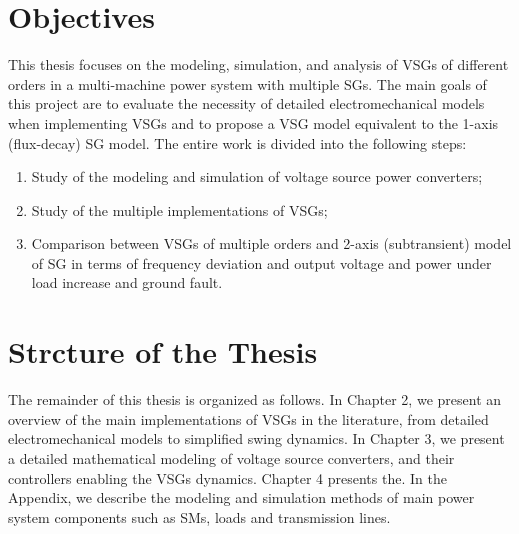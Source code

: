 \section{Objectives}
This thesis focuses on the modeling, simulation, and analysis of VSGs of
different orders in a multi-machine power system with multiple SGs. The main
goals of this project are to evaluate the necessity of detailed
electromechanical models when implementing VSGs and to propose a VSG model
equivalent to the 1-axis (flux-decay) SG model. The entire work is divided into
the following steps:

\begin{enumerate}
    \item Study of the modeling and simulation of voltage source power converters;
    \item Study of the multiple implementations of VSGs; 
    \item Comparison between VSGs of multiple orders and 2-axis (subtransient)
    model of SG in terms of frequency deviation and output voltage and power
    under load increase and ground fault.
\end{enumerate}

\section{Strcture of the Thesis}
The remainder of this thesis is organized as follows. In Chapter 2, we present
an overview of the main implementations of VSGs in the literature, from detailed
electromechanical models to simplified swing dynamics. In Chapter 3, we present
a detailed mathematical modeling of voltage source converters, and their
controllers enabling the VSGs dynamics. Chapter 4 presents the. In the Appendix,
we describe the modeling and simulation methods of main power system components
such as SMs, loads and transmission lines.